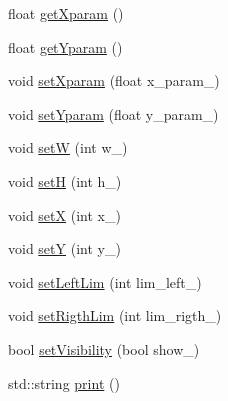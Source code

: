 \begin{DoxyCompactItemize}
\item 
float \hyperlink{classbarra_a040b06fae60c37a8d0bf920ec81bdd2e}{get\+Xparam} ()
\item 
float \hyperlink{classbarra_a2ad1e1404c26777ae5eaf4d061b5c59a}{get\+Yparam} ()
\item 
void \hyperlink{classbarra_a00b29986c97ade4c38fa733b4313c70a}{set\+Xparam} (float x\+\_\+param\+\_\+)
\item 
void \hyperlink{classbarra_ae8b4eda32ffea3d5d9dd3df639863a92}{set\+Yparam} (float y\+\_\+param\+\_\+)
\item 
void \hyperlink{classbarra_a1653a2f02c5c429afac46845ab35b50f}{setW} (int w\+\_\+)
\item 
void \hyperlink{classbarra_a527670e645cee76fd476f0fd731040a4}{setH} (int h\+\_\+)
\item 
void \hyperlink{classbarra_a9b3d595be05ea5ddb56f3f0b598dbb0b}{setX} (int x\+\_\+)
\item 
void \hyperlink{classbarra_a3571249441c47aa48766ab10fec170ad}{setY} (int y\+\_\+)
\item 
void \hyperlink{classbarra_a4e10b071b98e0573069c7336b98eeb48}{set\+Left\+Lim} (int lim\+\_\+left\+\_\+)
\item 
void \hyperlink{classbarra_a2758284b2c1f5a130b58809d29e12033}{set\+Rigth\+Lim} (int lim\+\_\+rigth\+\_\+)
\item 
bool \hyperlink{classbarra_a3adba01206e426ff809b896268c11996}{set\+Visibility} (bool show\+\_\+)
\item 
std\+::string \hyperlink{classbarra_a0a271777a0ec0abb48b1d5e5e1e0d5f1}{print} ()
\end{DoxyCompactItemize}
